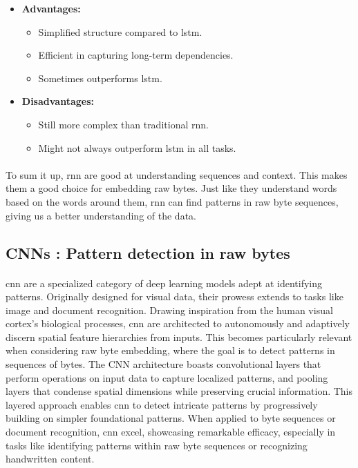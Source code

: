         \begin{itemize}
            \item \textbf{Advantages:} 
            \begin{itemize}
                \item Simplified structure compared to \acrshort{lstm}.
                \item Efficient in capturing long-term dependencies.
                \item Sometimes outperforms \acrshort{lstm}.
            \end{itemize}
            \item \textbf{Disadvantages:} 
            \begin{itemize}
                \item Still more complex than traditional \acrshort{rnn}.
                \item Might not always outperform \acrshort{lstm} in all tasks.
            \end{itemize}
        \end{itemize}
        

        \paragraph{}To sum it up, \acrshort{rnn} are good at understanding sequences and context. This makes them a good choice for embedding raw bytes. Just like they understand words based on the words around them, \acrshort{rnn} can find patterns in raw byte sequences, giving us a better understanding of the data.
    \subsection{CNNs : Pattern detection in raw bytes}
        \paragraph{}\acrfull{cnn}\cite{lecun_gradient-based_1998} are a specialized category of deep learning models adept at identifying patterns. Originally designed for visual data, their prowess extends to tasks like image and document recognition. Drawing inspiration from the human visual cortex's biological processes, \acrshort{cnn} are architected to autonomously and adaptively discern spatial feature hierarchies from inputs. This becomes particularly relevant when considering raw byte embedding, where the goal is to detect patterns in sequences of bytes. The CNN architecture boasts convolutional layers that perform operations on input data to capture localized patterns, and pooling layers that condense spatial dimensions while preserving crucial information. This layered approach enables \acrshort{cnn} to detect intricate patterns by progressively building on simpler foundational patterns. When applied to byte sequences or document recognition, \acrshort{cnn} excel, showcasing remarkable efficacy, especially in tasks like identifying patterns within raw byte sequences or recognizing handwritten content.

